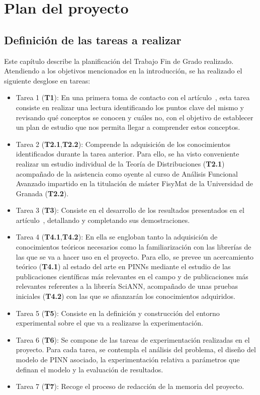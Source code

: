 \chapter{Plan del proyecto}\label{ch:primer-capitulo}
\section{Definición de las tareas a realizar}

Este capítulo describe la planificación del Trabajo Fin de Grado realizado. Atendiendo a los objetivos mencionados en la introducción, se ha realizado el siguiente desglose en tareas: 
\begin{itemize}
    \item Tarea 1 (\textbf{T1}): En una primera toma de contacto con el artículo~\cite{chen1995universal}, esta tarea consiste en realizar una lectura identificando los puntos clave del mismo y revisando qué conceptos se conocen y cuáles no, con el objetivo de establecer un plan de estudio que nos permita llegar a comprender estos conceptos.
    \item Tarea 2 (\textbf{T2.1},\textbf{T2.2}): Comprende la adquisición de los conocimientos identificados durante la tarea anterior. Para ello, se ha visto conveniente realizar un estudio individual de la Teoría de Distribuciones (\textbf{T2.1}) acompañado de la asistencia como oyente al curso de Análisis Funcional Avanzado impartido en la titulación de máster FisyMat de la Universidad de Granada (\textbf{T2.2}).
    \item Tarea 3 (\textbf{T3}): Consiste en el desarrollo de los resultados presentados en el artículo~\cite{chen1995universal}, detallando y completando sus demostraciones.
    \item Tarea 4 (\textbf{T4.1},\textbf{T4.2}): En ella se engloban tanto la adquisición de conocimientos teóricos necesarios como la familiarización con las librerías de las que se va a hacer uso en el proyecto. Para ello, se prevee un acercamiento teórico (\textbf{T4.1}) al estado del arte en PINNs mediante el estudio de las publicaciones científicas más relevantes en el campo y de publicaciones más relevantes referentes a la librería SciANN, acompañado de unas pruebas iniciales (\textbf{T4.2}) con las que se afianzarán los conocimientos adquiridos.   
    \item Tarea 5 (\textbf{T5}): Consiste en la definición y construcción del entorno experimental sobre el que va a realizarse la experimentación.
    \item Tarea 6 (\textbf{T6}): Se compone de las tareas de experimentación realizadas en el proyecto. Para cada tarea, se contempla el análisis del problema, el diseño del modelo de PINN asociado, la experimentación relativa a parámetros que definan el modelo y la evaluación de resultados. 
    \item Tarea 7 (\textbf{T7}): Recoge el proceso de redacción de la memoria del proyecto. 
\end{itemize}




